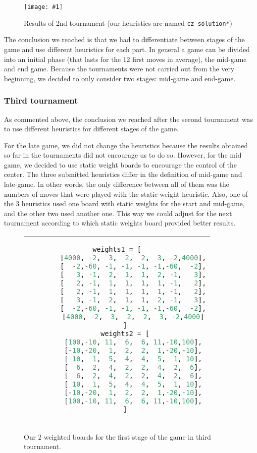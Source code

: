 \documentclass{article}
\newcommand{\myFigure}[4]{%
    \begin{figure}[H]
        \texttt{[image: \#1]}
        \centering
        \caption{#2}
        \label{#3}
    \end{figure}
}
\begin{document}
\myFigure{./images/tournament2.png}{Results of 2nd tournament (our heuristics are named \texttt{cz\_solution*})}{tour2}{.8}

The conclusion we reached is that we had to differentiate between stages of the game and use different heuristics for each part. In general a game can be divided into an initial phase (that lasts for the 12 first moves in average), the mid-game and end game. Because the tournaments were not carried out from the very beginning, we decided to only consider two stages: mid-game and end-game.


\subsubsection{Third tournament }

As commented above, the conclusion we reached after the second tournament was to use different heuristics for different stages of the game.

For the late game, we did not change the heuristics because the results obtained so far in the tournaments did not encourage us to do so. However, for the mid game, we decided to use static weight boards to encourage the control of the center. The three submitted heuristics differ in the definition of mid-game and late-game. In other words, the only difference between all of them was the numbers of moves that were played with the static weight heuristic. Also, one of the 3 heuristics used one board with static weights for the start and mid-game, and the other two used another one. This way we could adjust for the next tournament according to which static weights board provided better results.

\begin{figure}[h!]
    \centering
    \begin{tabular}{c}
    \begin{lstlisting}[language=python,linewidth=0.5\textwidth]
    weights1 = [
        [4000, -2,  3,  2,  2,  3, -2,4000],
        [  -2,-60, -1, -1, -1, -1,-60,  -2],
        [   3, -1,  2,  1,  1,  2, -1,   3],
        [   2, -1,  1,  1,  1,  1, -1,   2],
        [   2, -1,  1,  1,  1,  1, -1,   2],
        [   3, -1,  2,  1,  1,  2, -1,   3],
        [  -2,-60, -1, -1, -1, -1,-60,  -2],
        [4000, -2,  3,  2,  2,  3, -2,4000]
    ]
    weights2 = [
        [100,-10, 11,  6,  6, 11,-10,100],
        [-10,-20,  1,  2,  2,  1,-20,-10],
        [ 10,  1,  5,  4,  4,  5,  1, 10],
        [  6,  2,  4,  2,  2,  4,  2,  6],
        [  6,  2,  4,  2,  2,  4,  2,  6],
        [ 10,  1,  5,  4,  4,  5,  1, 10],
        [-10,-20,  1,  2,  2,  1,-20,-10],
        [100,-10, 11,  6,  6, 11,-10,100],
    ]
        \end{lstlisting}
    \end{tabular}
    \caption{Our 2 weighted boards for the first stage of the game in third tournament.}\label{weighted_boards2}
\end{figure}
\end{document}
